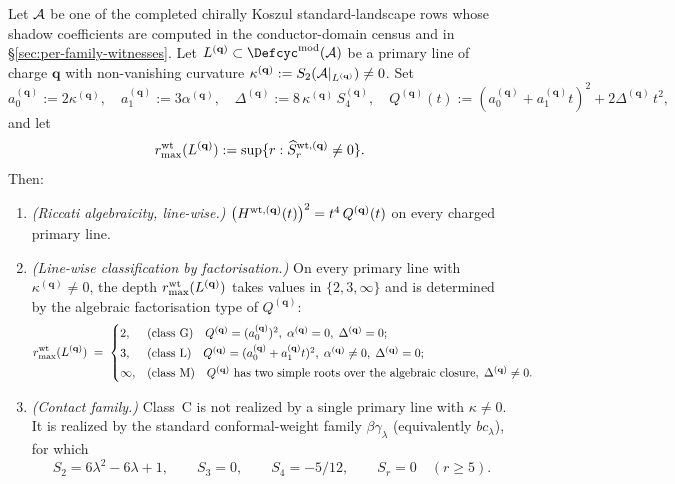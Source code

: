 \begin{theorem}
\label{thm:quadrichotomy}
\ClaimStatusConditional
Let $\mathcal{A}$ be one of the completed chirally Koszul standard-landscape
rows whose shadow coefficients are computed in the conductor-domain
census and in \S\ref{sec:per-family-witnesses}. Let
$L^{(\mathbf q)} \subset \Defcyc^{\rm mod}(\cA)$ be a primary line of
charge $\mathbf q$ with non-vanishing curvature
$\kappa^{(\mathbf q)} := S_2(\mathcal{A}|_{L^{(\mathbf q)}}) \neq 0$.
Set
\[
a_0^{(\mathbf q)} := 2\kappa^{(\mathbf q)},
\quad
a_1^{(\mathbf q)} := 3\alpha^{(\mathbf q)},
\quad
\Delta^{(\mathbf q)} := 8\,\kappa^{(\mathbf q)}\,S_4^{(\mathbf q)},
\quad
Q^{(\mathbf q)}(t) := (a_0^{(\mathbf q)} + a_1^{(\mathbf q)} t)^{2}
 + 2\Delta^{(\mathbf q)}\,t^{2},
\]
and let
\[
r^{\rm wt}_{\max}(L^{(\mathbf q)})
:= \sup\{r : \widehat S^{\rm wt,(\mathbf q)}_r \neq 0\}.
\]
Then:
\begin{enumerate}[label=\textup{(\roman*)}]
\item\label{quad:i} \emph{(Riccati algebraicity, line-wise.)}
$\bigl(H^{\rm wt,(\mathbf q)}(t)\bigr)^{2}
= t^{4}\,Q^{(\mathbf q)}(t)$ on every charged primary line.
\item\label{quad:ii} \emph{(Line-wise classification by
factorisation.)} On every primary line with
$\kappa^{(\mathbf q)} \neq 0$, the depth
$r^{\rm wt}_{\max}(L^{(\mathbf q)})$ takes values in
$\{2, 3, \infty\}$ and
is determined by the algebraic
factorisation type of $Q^{(\mathbf q)}$:
\[
r^{\rm wt}_{\max}(L^{(\mathbf q)}) \;=\;
\begin{cases}
2,
 & \text{(class G)}\quad
 Q^{(\mathbf q)} = (a_0^{(\mathbf q)})^{2},\;
 \alpha^{(\mathbf q)} = 0,\; \Delta^{(\mathbf q)} = 0; \\[2pt]
3,
 & \text{(class L)}\quad
 Q^{(\mathbf q)} = (a_0^{(\mathbf q)} + a_1^{(\mathbf q)} t)^{2},\;
 \alpha^{(\mathbf q)} \neq 0,\; \Delta^{(\mathbf q)} = 0; \\[2pt]
\infty,
 & \text{(class M)}\quad
 Q^{(\mathbf q)} \text{ has two simple roots over the algebraic
 closure},\;
 \Delta^{(\mathbf q)} \neq 0.
\end{cases}
\]
\item\label{quad:iii} \emph{(Contact family.)}
Class~C is not realized by a single primary line with $\kappa \neq 0$.
It is realized by the standard conformal-weight family
$\beta\gamma_\lambda$ (equivalently $bc_\lambda$), for which
\[
 S_2 = 6\lambda^2 - 6\lambda + 1,\qquad
 S_3 = 0,\qquad
 S_4 = -5/12,\qquad
 S_r = 0 \quad (r \ge 5).
\]
\end{enumerate}
\end{theorem}
